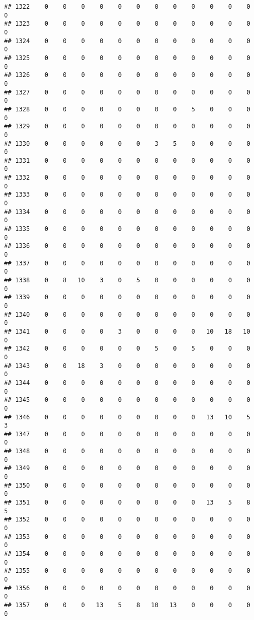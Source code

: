 \documentclass[]{article}
\begin{document}
\begin{verbatim}
## 1322    0    0    0    0    0    0    0    0    0    0    0    0    0
## 1323    0    0    0    0    0    0    0    0    0    0    0    0    0
## 1324    0    0    0    0    0    0    0    0    0    0    0    0    0
## 1325    0    0    0    0    0    0    0    0    0    0    0    0    0
## 1326    0    0    0    0    0    0    0    0    0    0    0    0    0
## 1327    0    0    0    0    0    0    0    0    0    0    0    0    0
## 1328    0    0    0    0    0    0    0    0    5    0    0    0    0
## 1329    0    0    0    0    0    0    0    0    0    0    0    0    0
## 1330    0    0    0    0    0    0    3    5    0    0    0    0    0
## 1331    0    0    0    0    0    0    0    0    0    0    0    0    0
## 1332    0    0    0    0    0    0    0    0    0    0    0    0    0
## 1333    0    0    0    0    0    0    0    0    0    0    0    0    0
## 1334    0    0    0    0    0    0    0    0    0    0    0    0    0
## 1335    0    0    0    0    0    0    0    0    0    0    0    0    0
## 1336    0    0    0    0    0    0    0    0    0    0    0    0    0
## 1337    0    0    0    0    0    0    0    0    0    0    0    0    0
## 1338    0    8   10    3    0    5    0    0    0    0    0    0    0
## 1339    0    0    0    0    0    0    0    0    0    0    0    0    0
## 1340    0    0    0    0    0    0    0    0    0    0    0    0    0
## 1341    0    0    0    0    3    0    0    0    0   10   18   10    0
## 1342    0    0    0    0    0    0    5    0    5    0    0    0    0
## 1343    0    0   18    3    0    0    0    0    0    0    0    0    0
## 1344    0    0    0    0    0    0    0    0    0    0    0    0    0
## 1345    0    0    0    0    0    0    0    0    0    0    0    0    0
## 1346    0    0    0    0    0    0    0    0    0   13   10    5    3
## 1347    0    0    0    0    0    0    0    0    0    0    0    0    0
## 1348    0    0    0    0    0    0    0    0    0    0    0    0    0
## 1349    0    0    0    0    0    0    0    0    0    0    0    0    0
## 1350    0    0    0    0    0    0    0    0    0    0    0    0    0
## 1351    0    0    0    0    0    0    0    0    0   13    5    8    5
## 1352    0    0    0    0    0    0    0    0    0    0    0    0    0
## 1353    0    0    0    0    0    0    0    0    0    0    0    0    0
## 1354    0    0    0    0    0    0    0    0    0    0    0    0    0
## 1355    0    0    0    0    0    0    0    0    0    0    0    0    0
## 1356    0    0    0    0    0    0    0    0    0    0    0    0    0
## 1357    0    0    0   13    5    8   10   13    0    0    0    0    0

\end{verbatim}
\end{document}
